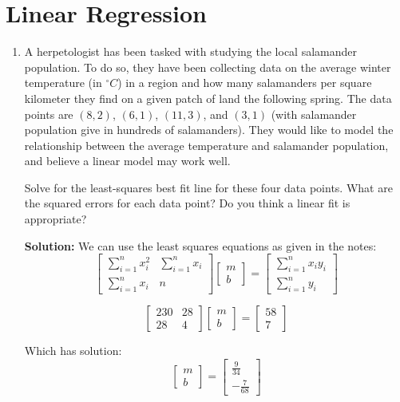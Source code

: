 \documentclass[letterpaper, 11pt]{article}
\begin{document}
\section{Linear Regression}
\begin{enumerate}
\item A herpetologist has been tasked with studying the local salamander population. To do so, they have been collecting data on the average winter temperature (in $^\circ C$) in a region and how many salamanders per square kilometer they find on a given patch of land the following spring. The data points are $(8, 2)$, $(6, 1)$, $(11, 3)$, and $(3, 1)$ (with salamander population give in hundreds of salamanders). They would like to model the relationship between the average temperature and salamander population, and believe a linear model may work well. 

\par Solve for the least-squares best fit line for these four data points. What are the squared errors for each data point? Do you think a linear fit is appropriate? 

\par \textbf{Solution:} We can use the least squares equations as given in the notes:
\[ \left[ \begin{array}{cc}  \sum_{i=1}^n x_i^2 & \sum_{i=1}^n x_i \\ \sum_{i=1}^n x_i & n \end{array}\right] 
\left[ \begin{array}{c} m \\ b \end{array} \right] =
\left[ \begin{array}{c} \sum_{i=1}^n x_i y_i \\ \sum_{i=1}^n y_i \end{array} \right] \]

\[ \left[ \begin{array}{cc} 230  & 28 \\ 28 & 4 \end{array}\right] 
\left[ \begin{array}{c} m \\ b \end{array} \right] =
\left[ \begin{array}{c} 58 \\ 7 \end{array} \right] \]

Which has solution:
\[ \left[ \begin{array}{c} m \\ b \end{array} \right] = \left[ \begin{array}{c} \frac{9}{34} \\ -\frac{7}{68} \end{array} \right] \]



\end{enumerate}
\end{document}
